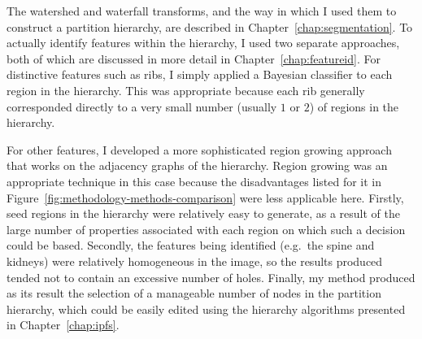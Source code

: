%
The watershed and waterfall transforms, and the way in which I used them to construct a partition hierarchy, are described in Chapter~\ref{chap:segmentation}. To actually identify features within the hierarchy, I used two separate approaches, both of which are discussed in more detail in Chapter~\ref{chap:featureid}. For distinctive features such as ribs, I simply applied a Bayesian classifier to each region in the hierarchy. This was appropriate because each rib generally corresponded directly to a very small number (usually $1$ or $2$) of regions in the hierarchy.

For other features, I developed a more sophisticated region growing approach that works on the adjacency graphs of the hierarchy. Region growing was an appropriate technique in this case because the disadvantages listed for it in Figure~\ref{fig:methodology-methods-comparison} were less applicable here. Firstly, seed regions in the hierarchy were relatively easy to generate, as a result of the large number of properties associated with each region on which such a decision could be based. Secondly, the features being identified (e.g.~the spine and kidneys) were relatively homogeneous in the image, so the results produced tended not to contain an excessive number of holes. Finally, my method produced as its result the selection of a manageable number of nodes in the partition hierarchy, which could be easily edited using the hierarchy algorithms presented in Chapter~\ref{chap:ipfs}.

